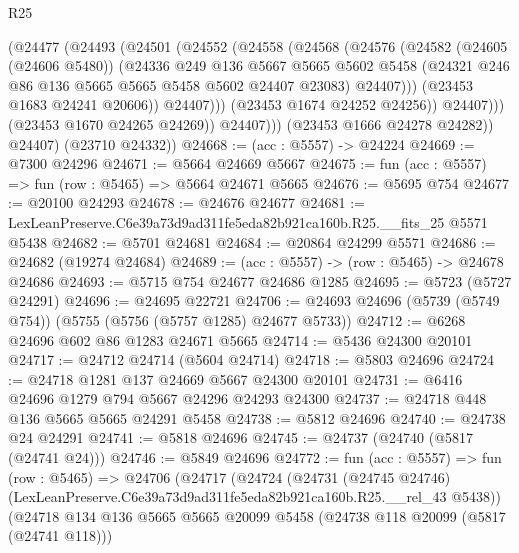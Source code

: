 \begin{lexlean}{R25}
\begin{coremodule}
                      (@24477
                        (@24493
                          (@24501
                            (@24552
                              (@24558
                                (@24568
                                  (@24576
                                    (@24582
                                      (@24605 (@24606 @5480))
                                      (@24336
                                        @249
                                        @136
                                        @5667
                                        @5665
                                        @5602
                                        @5458
                                        (@24321 @246 @86 @136 @5665 @5665 @5458 @5602 @24407 @23083)
                                        @24407)))
                                  (@23453 @1683 @24241 @20606))
                                @24407)))
                          (@23453 @1674 @24252 @24256))
                        @24407)))
                  (@23453 @1670 @24265 @24269))
                @24407)))
          (@23453 @1666 @24278 @24282))
        @24407)
      (@23710 @24332))
@24668 := (acc : @5557) -> @24224
@24669 := @7300 @24296
@24671 := @5664 @24669 @5667
@24675 := fun (acc : @5557) => fun (row : @5465) => @5664 @24671 @5665
@24676 := @5695 @754
@24677 := @20100 @24293
@24678 := @24676 @24677
@24681 := LexLeanPreserve.C6e39a73d9ad311fe5eda82b921ca160b.R25.__fits_25 @5571 @5438
@24682 := @5701 @24681
@24684 := @20864 @24299 @5571
@24686 := @24682 (@19274 @24684)
@24689 := (acc : @5557) -> (row : @5465) -> @24678 @24686
@24693 := @5715 @754 @24677 @24686 @1285
@24695 := @5723 (@5727 @24291)
@24696 := @24695 @22721
@24706 := @24693 @24696 (@5739 (@5749 @754)) (@5755 (@5756 (@5757 @1285) @24677 @5733))
@24712 := @6268 @24696 @602 @86 @1283 @24671 @5665
@24714 := @5436 @24300 @20101
@24717 := @24712 @24714 (@5604 @24714)
@24718 := @5803 @24696
@24724 := @24718 @1281 @137 @24669 @5667 @24300 @20101
@24731 := @6416 @24696 @1279 @794 @5667 @24296 @24293 @24300
@24737 := @24718 @448 @136 @5665 @5665 @24291 @5458
@24738 := @5812 @24696
@24740 := @24738 @24 @24291
@24741 := @5818 @24696
@24745 := @24737 (@24740 (@5817 (@24741 @24)))
@24746 := @5849 @24696
@24772 := fun (acc : @5557) =>
  fun (row : @5465) =>
  @24706
    (@24717
      (@24724
        (@24731
          (@24745 @24746)
          (LexLeanPreserve.C6e39a73d9ad311fe5eda82b921ca160b.R25.__rel_43 @5438))
        (@24718
          @134
          @136
          @5665
          @5665
          @20099
          @5458
          (@24738 @118 @20099 (@5817 (@24741 @118)))

\end{coremodule}
\end{lexlean}
